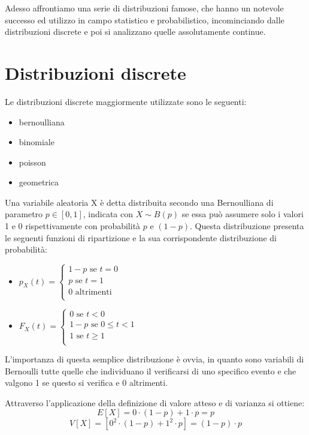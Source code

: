 \documentclass[a4paper,12pt, oneside]{book}
\begin{document}
Adesso affrontiamo una serie di distribuzioni famose, che hanno un notevole successo ed utilizzo in campo
statistico e probabilistico, incominciando dalle distribuzioni discrete e poi si analizzano quelle assolutamente continue.

\section{Distribuzioni discrete}
Le distribuzioni discrete maggiormente utilizzate sono le seguenti:
\begin{itemize}
    \item bernoulliana
    \item binomiale
    \item poisson
    \item geometrica
\end{itemize}
Una variabile aleatoria X è detta distribuita secondo una Bernoulliana di parametro $p\in[0,1]$, indicata con
$X \sim B(p)$ se essa può assumere solo i valori 1 e 0 rispettivamente con probabilità $p$ e $(1 - p)$.\newline
Questa distribuzione presenta le seguenti funzioni di ripartizione e la sua corrispondente distribuzione di probabilità:
\begin{itemize}
    \item $p_X(t) = \begin{cases}
                    1 - p \mbox{ se } t = 0\\
                    p     \mbox{ se } t = 1\\
                    0     \mbox{ altrimenti}\\
                    \end{cases}$
    \item $F_X(t) = \begin{cases}
                    0     \mbox{ se } t < 0\\
                    1 - p \mbox{ se } 0 \leq t < 1\\
                    1     \mbox{ se } t \geq 1\\
                    \end{cases}$
\end{itemize}
L'importanza di questa semplice distribuzione è ovvia, in quanto sono variabili di Bernoulli tutte quelle
che individuano il verificarsi di uno specifico evento e che valgono 1 se questo si verifica e 0 altrimenti.

Attraverso l'applicazione della definizione di valore atteso e di varianza si ottiene:
    \[ E[X] = 0 \cdot (1-p) + 1\cdot p = p\]
    \[ V[X] = [0^2 \cdot (1-p) + 1^2 \cdot p] = (1-p) \cdot p\]
\end{document}
